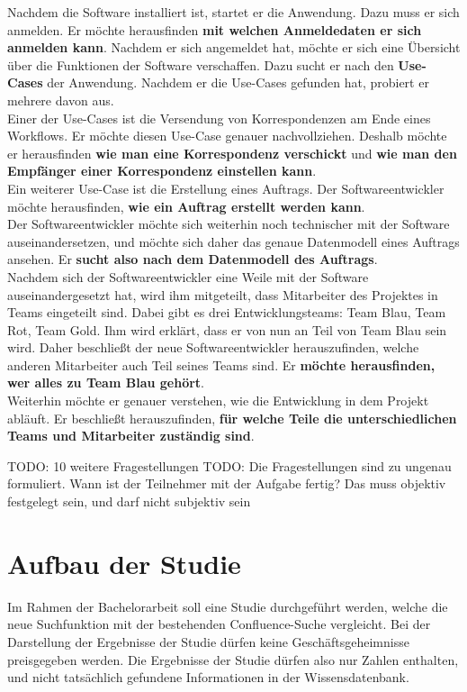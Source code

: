 Nachdem die Software installiert ist, startet er die Anwendung.
Dazu muss er sich anmelden.
Er möchte herausfinden \textbf{mit welchen Anmeldedaten er sich anmelden kann}.
Nachdem er sich angemeldet hat, möchte er sich eine Übersicht über die Funktionen der Software verschaffen.
Dazu sucht er nach den \textbf{Use-Cases} der Anwendung.
Nachdem er die Use-Cases gefunden hat, probiert er mehrere davon aus.\\

Einer der Use-Cases ist die Versendung von Korrespondenzen am Ende eines Workflows.
Er möchte diesen Use-Case genauer nachvollziehen.
Deshalb möchte er herausfinden \textbf{wie man eine Korrespondenz verschickt} und \textbf{wie man den Empfänger einer Korrespondenz einstellen kann}.\\

Ein weiterer Use-Case ist die Erstellung eines Auftrags.
Der Softwareentwickler möchte herausfinden, \textbf{wie ein Auftrag erstellt werden kann}.\\

Der Softwareentwickler möchte sich weiterhin noch technischer mit der Software auseinandersetzen, und möchte sich daher das genaue Datenmodell eines Auftrags ansehen.
Er \textbf{sucht also nach dem Datenmodell des Auftrags}.\\

Nachdem sich der Softwareentwickler eine Weile mit der Software auseinandergesetzt hat, wird ihm mitgeteilt, dass Mitarbeiter des Projektes in Teams eingeteilt sind.
Dabei gibt es drei Entwicklungsteams: Team Blau, Team Rot, Team Gold.
Ihm wird erklärt, dass er von nun an Teil von Team Blau sein wird.
Daher beschließt der neue Softwareentwickler herauszufinden, welche anderen Mitarbeiter auch Teil seines Teams sind.
Er \textbf{möchte herausfinden, wer alles zu Team Blau gehört}.\\

Weiterhin möchte er genauer verstehen, wie die Entwicklung in dem Projekt abläuft.
Er beschließt herauszufinden, \textbf{für welche Teile die unterschiedlichen Teams und Mitarbeiter zuständig sind}.

TODO: 10 weitere Fragestellungen
TODO: Die Fragestellungen sind zu ungenau formuliert. Wann ist der Teilnehmer mit der Aufgabe fertig? Das muss objektiv festgelegt sein, und darf nicht subjektiv sein

\section{Aufbau der Studie}
Im Rahmen der Bachelorarbeit soll eine Studie durchgeführt werden, welche die neue Suchfunktion mit der bestehenden Confluence-Suche vergleicht.
Bei der Darstellung der Ergebnisse der Studie dürfen keine Geschäftsgeheimnisse preisgegeben werden.
Die Ergebnisse der Studie dürfen also nur Zahlen enthalten, und nicht tatsächlich gefundene Informationen in der Wissensdatenbank.\\

